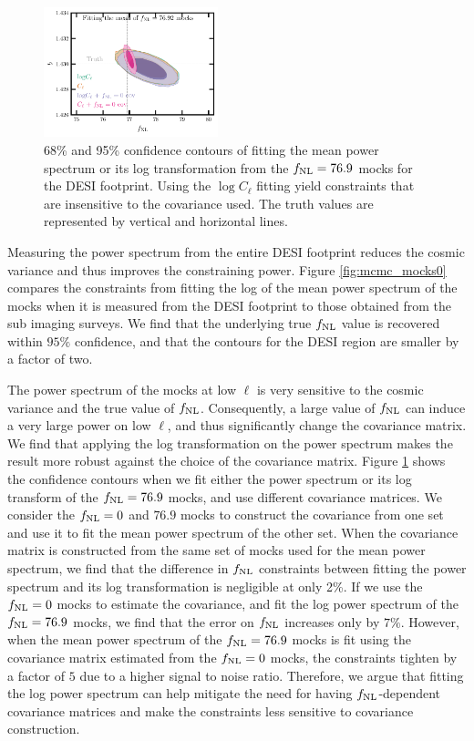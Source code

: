 \begin{figure}
    \centering
    \includegraphics[width=0.45\textwidth]{figures/mcmc_po100.pdf} 
    \caption{68\% and 95\% confidence contours of fitting the mean power spectrum or its log transformation from the $f_{\rm NL}=76.9$ mocks for the DESI footprint. Using the $\log C_{\ell}$ fitting yield constraints that are insensitive to the covariance used. The truth values are represented by vertical and horizontal lines.}\label{fig:mcmc_mocks100}
\end{figure}

Measuring the power spectrum from the entire DESI footprint reduces the cosmic variance and thus improves the constraining power. Figure \ref{fig:mcmc_mocks0} compares the constraints from fitting the log of the mean power spectrum of the mocks when it is measured from the DESI footprint to those obtained from the sub imaging surveys. We find that the underlying true $f_{\rm NL}$ value is recovered within $95\%$ confidence, and that the contours for the DESI region are smaller by a factor of two. 

The power spectrum of the mocks at low $\ell$ is very sensitive to the cosmic variance and the true value of $f_{\rm NL}$. Consequently, a large value of $f_{\rm NL}$ can induce a very large power on low $\ell$, and thus significantly change the covariance matrix. We find that applying the log transformation on the power spectrum makes the result more robust against the choice of the covariance matrix. Figure \ref{fig:mcmc_mocks100} shows the confidence contours when we fit either the power spectrum or its log transform of the $f_{\rm NL}=76.9$ mocks, and use different covariance matrices. We consider the $f_{\rm NL}=0$ and $76.9$ mocks to construct the covariance from one set and use it to fit the mean power spectrum of the other set. When the covariance matrix is constructed from the same set of mocks used for the mean power spectrum, we find that the difference in $f_{\rm NL}$ constraints between fitting the power spectrum and its log transformation is negligible at only 2\%. If we use the $f_{\rm NL}=0$ mocks to estimate the covariance, and fit the log power spectrum of the $f_{\rm NL}=76.9$ mocks, we find that the error on $f_{\rm NL}$ increases only by $7\%$. However, when the mean power spectrum of the $f_{\rm NL}=76.9$ mocks is fit using the covariance matrix estimated from the $f_{\rm NL}=0$ mocks, the constraints tighten by a factor of $5$ due to a higher signal to noise ratio. Therefore, we argue that fitting the log power spectrum can help mitigate the need for having $f_{\rm NL}$-dependent covariance matrices and make the constraints less sensitive to covariance construction.

